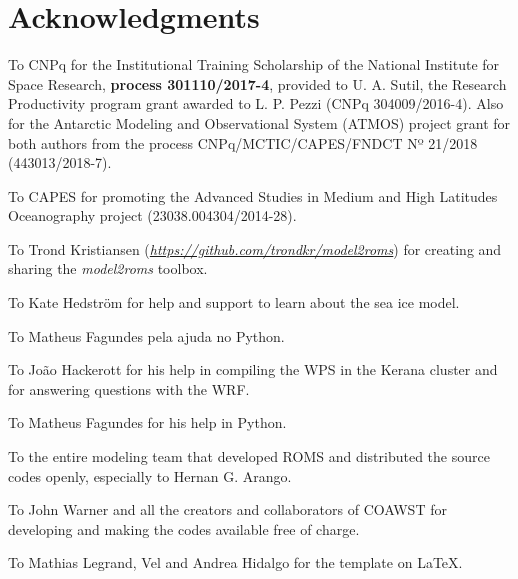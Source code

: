 \chapter*{Acknowledgments}

\bigskip


\noindent To CNPq for the Institutional Training Scholarship of the National Institute for Space Research, \textbf{process 301110/2017-4},
provided to U. A. Sutil, the Research Productivity program grant awarded to L. P. Pezzi (CNPq 304009/2016-4). Also for the Antarctic Modeling 
and Observational System (ATMOS) project grant for both authors from the process CNPq/MCTIC/CAPES/FNDCT Nº 21/2018 (443013/2018-7).
\bigskip

\noindent To CAPES for promoting the Advanced Studies in Medium and High Latitudes Oceanography project (23038.004304/2014-28). 
\bigskip

\noindent To Trond Kristiansen (\textcolor{bleu_cite}{\textit{\href{https://github.com/trondkr/model2roms}{https://github.com/trondkr/model2roms}}}) for creating 
and sharing the \textit{model2roms} toolbox.
\bigskip

\noindent To Kate Hedström for help and support to learn about the sea ice model.
\bigskip

\noindent To Matheus Fagundes pela ajuda no Python. 
\bigskip

\noindent To João Hackerott for his help in compiling the WPS in the Kerana cluster and for answering questions with the WRF.
\bigskip

\noindent To Matheus Fagundes for his help in Python.
\bigskip

\noindent To the entire modeling team that developed ROMS and distributed the source codes openly,
especially to Hernan G. Arango.
\bigskip

\noindent To John Warner and all the creators and collaborators of COAWST for developing and making the codes available free of charge.
\bigskip

\noindent To Mathias Legrand, Vel and Andrea Hidalgo for the template on \LaTeX.
\bigskip